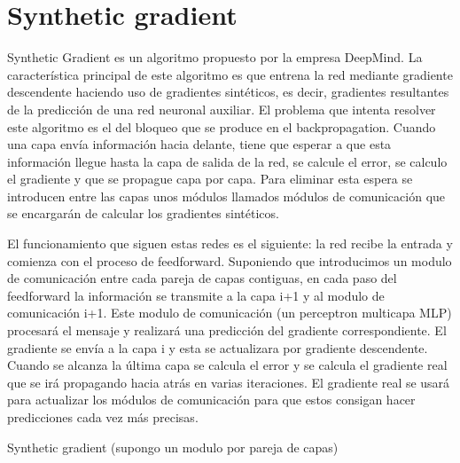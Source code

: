 \section{Synthetic gradient}

Synthetic Gradient es un algoritmo propuesto por la empresa DeepMind. La característica principal de este algoritmo es que entrena la red mediante gradiente descendente haciendo uso de gradientes sintéticos, es decir, gradientes resultantes de la predicción de una red neuronal auxiliar. El problema que intenta resolver este algoritmo es el del bloqueo que se produce en el backpropagation. Cuando una capa envía información hacia delante, tiene que esperar a que esta información llegue hasta la capa de salida de la red, se calcule el error, se calculo el gradiente y que se propague capa por capa. Para eliminar esta espera se introducen entre las capas unos módulos llamados módulos de comunicación que se encargarán de calcular los gradientes sintéticos. 

El funcionamiento que siguen estas redes es el siguiente: la red recibe la entrada y comienza con el proceso de feedforward. Suponiendo que introducimos un modulo de comunicación entre cada pareja de capas contiguas, en cada paso del feedforward la información se transmite a la capa i+1 y al modulo de comunicación i+1. Este modulo de comunicación (un perceptron multicapa MLP) procesará el mensaje y realizará una predicción del gradiente correspondiente. El gradiente se envía a la capa i y esta se actualizara por gradiente descendente. Cuando se alcanza la última capa se calcula el error y se calcula el gradiente real que se irá propagando hacia atrás en varias iteraciones. El gradiente real se usará para actualizar los módulos de comunicación para que estos consigan hacer predicciones cada vez más precisas.

\begin{algorithm}
   \caption{Synthetic gradient (supongo un modulo por pareja de capas)}
\end{algorithm}

